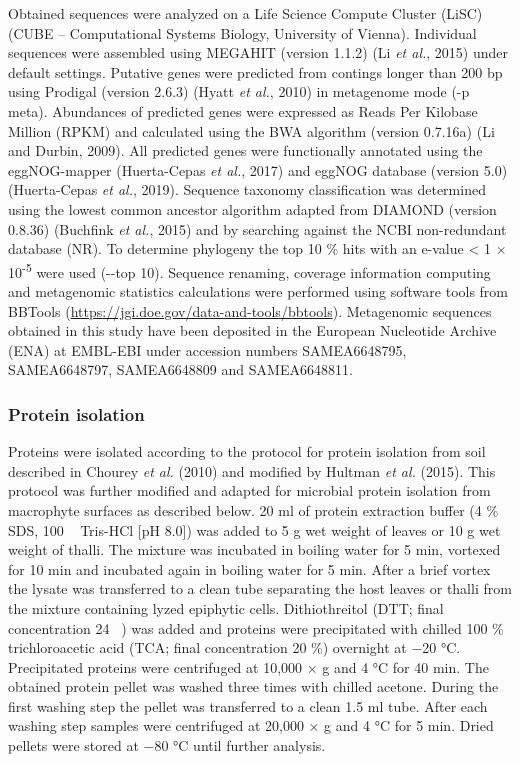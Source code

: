 \documentclass[
  12pt,
]{article}
\begin{document}
Obtained sequences were analyzed on a Life Science Compute Cluster
(LiSC) (CUBE -- Computational Systems Biology, University of Vienna).
Individual sequences were assembled using MEGAHIT (version 1.1.2) (Li
\emph{et al.}, 2015) under default settings. Putative genes were
predicted from contings longer than 200 bp using Prodigal (version
2.6.3) (Hyatt \emph{et al.}, 2010) in metagenome mode (-p meta).
Abundances of predicted genes were expressed as Reads Per Kilobase
Million (RPKM) and calculated using the BWA algorithm (version 0.7.16a)
(Li and Durbin, 2009). All predicted genes were functionally annotated
using the eggNOG-mapper (Huerta-Cepas \emph{et al.}, 2017) and eggNOG
database (version 5.0) (Huerta-Cepas \emph{et al.}, 2019). Sequence
taxonomy classification was determined using the lowest common ancestor
algorithm adapted from DIAMOND (version 0.8.36) (Buchfink \emph{et al.},
2015) and by searching against the NCBI non-redundant database (NR). To
determine phylogeny the top 10 \si{\percent} hits with an e-value
\textless{} 1 × 10\textsuperscript{-5} were used (-\/-top 10). Sequence
renaming, coverage information computing and metagenomic statistics
calculations were performed using software tools from BBTools
(\url{https://jgi.doe.gov/data-and-tools/bbtools}). Metagenomic
sequences obtained in this study have been deposited in the European
Nucleotide Archive (ENA) at EMBL-EBI under accession numbers
SAMEA6648795, SAMEA6648797, SAMEA6648809 and SAMEA6648811.

\hypertarget{protein-isolation}{%
\subsubsection{Protein isolation}\label{protein-isolation}}

Proteins were isolated according to the protocol for protein isolation
from soil described in Chourey \emph{et al.} (2010) and modified by
Hultman \emph{et al.} (2015). This protocol was further modified and
adapted for microbial protein isolation from macrophyte surfaces as
described below. 20 \si{\ml} of protein extraction buffer (4
\si{\percent} SDS, 100 \si{\milli\Molar} Tris-HCl {[}pH 8.0{]}) was
added to 5 \si{\g} wet weight of leaves or 10 \si{\g} wet weight of
thalli. The mixture was incubated in boiling water for 5 \si{\minute},
vortexed for 10 \si{\minute} and incubated again in boiling water for 5
\si{\minute}. After a brief vortex the lysate was transferred to a clean
tube separating the host leaves or thalli from the mixture containing
lyzed epiphytic cells. Dithiothreitol (DTT; final concentration 24
\si{\milli\Molar}) was added and proteins were precipitated with chilled
100 \si{\percent} trichloroacetic acid (TCA; final concentration 20
\si{\percent}) overnight at \num{-20} °C. Precipitated proteins were
centrifuged at 10,000 × g and 4 \si{\degreeCelsius} for 40 \si{\minute}.
The obtained protein pellet was washed three times with chilled acetone.
During the first washing step the pellet was transferred to a clean 1.5
\si{\ml} tube. After each washing step samples were centrifuged at
20,000 × g and 4 \si{\degreeCelsius} for 5 \si{\minute}. Dried pellets
were stored at \num{-80} °C until further analysis.
\end{document}
